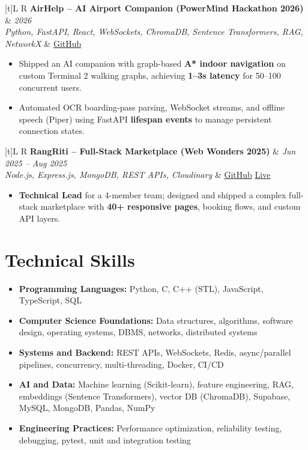 \documentclass[a4paper,10pt]{article}
\newcommand{\resumeProject}[4]{
  \vspace{0.5mm}
  \noindent
  \begin{tabularx}{\textwidth}[t]{L R}
    \textbf{#1} & \textit{#3} \\
    \textit{#2} & #4 \\
  \end{tabularx}
  \vspace{-0.5mm}
}
\begin{document}
\resumeProject
  {AirHelp -- AI Airport Companion (PowerMind Hackathon 2026)}
  {Python, FastAPI, React, WebSockets, ChromaDB, Sentence Transformers, RAG, NetworkX}
  {2026}
  {\href{https://github.com/Ojas-Srivastava05/AirHelp-AI-Airport-Assistant}{GitHub}}
\begin{itemize}
  \item Shipped an AI companion with graph-based \textbf{A* indoor navigation} on custom Terminal 2 walking graphs, achieving \textbf{1--3s latency} for 50--100 concurrent users.
  \item Automated OCR boarding-pass parsing, WebSocket streams, and offline speech (Piper) using FastAPI \textbf{lifespan events} to manage persistent connection states.
\end{itemize}

\resumeProject
  {RangRiti -- Full-Stack Marketplace (Web Wonders 2025)}
  {Node.js, Express.js, MongoDB, REST APIs, Cloudinary}
  {Jun 2025 -- Aug 2025}
  {\href{https://github.com/Ojas-Srivastava05/RangRiti}{GitHub} \textbar{} \href{https://rangriti.onrender.com/}{Live}}
\begin{itemize}
  \item \textbf{Technical Lead} for a 4-member team; designed and shipped a complex full-stack marketplace with \textbf{40+ responsive pages}, booking flows, and custom API layers.
\end{itemize}

\section{Technical Skills}
\small
\begin{itemize}[label={}]
  \item \textbf{Programming Languages:} Python, C, C++ (STL), JavaScript, TypeScript, SQL
  \item \textbf{Computer Science Foundations:} Data structures, algorithms, software design, operating systems, DBMS, networks, distributed systems
  \item \textbf{Systems and Backend:} REST APIs, WebSockets, Redis, async/parallel pipelines, concurrency, multi-threading, Docker, CI/CD
  \item \textbf{AI and Data:} Machine learning (Scikit-learn), feature engineering, RAG, embeddings (Sentence Transformers), vector DB (ChromaDB), Supabase, MySQL, MongoDB, Pandas, NumPy
  \item \textbf{Engineering Practices:} Performance optimization, reliability testing, debugging, pytest, unit and integration testing
\end{itemize}
\end{document}
